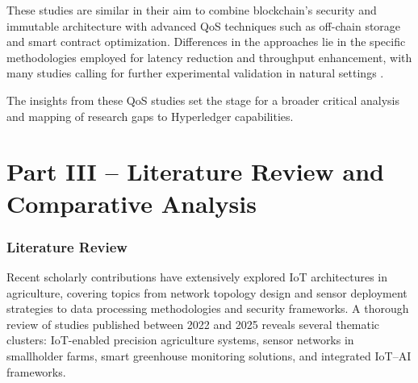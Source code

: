 \documentclass[12pt,onecolumn]{IEEEtran} %
\begin{document}
These studies are similar in their aim to combine blockchain's security and immutable architecture with advanced QoS techniques such as off-chain storage and smart contract optimization. Differences in the approaches lie in the specific methodologies employed for latency reduction and throughput enhancement, with many studies calling for further experimental validation in natural settings \cite{ellahi2023blockchainbasedframeworksfor, ellahi2023blockchainbasedframeworksfor}.

The insights from these QoS studies set the stage for a broader critical analysis and mapping of research gaps to Hyperledger capabilities.



\part*{Part III – Literature Review and Comparative Analysis}

\section{Literature Review}\label{sec:lit-review}
Recent scholarly contributions have extensively explored IoT architectures in agriculture, covering topics from network topology design and sensor deployment strategies to data processing methodologies and security frameworks. A thorough review of studies published between 2022 and 2025 reveals several thematic clusters: IoT-enabled precision agriculture systems, sensor networks in smallholder farms, smart greenhouse monitoring solutions, and integrated IoT–AI frameworks.

\end{document}
